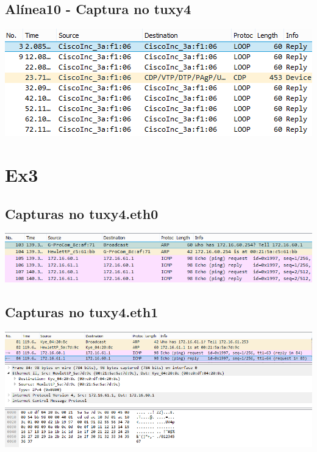 \documentclass[11pt,a4paper,reqno]{report}
\numberwithin{equation}{section}
\begin{document}
\begin{appendices}
\subsection{Alínea10 - Captura no tuxy4}
\includegraphics[width=18cm]{ex2_a10_tux4.png}

\section{Ex3}%

\subsection{Capturas no tuxy4.eth0}
\label{ex3_eth0}
\includegraphics[width=18cm]{ex3_tux4eth0_ARP.png}

\subsection{Capturas no tuxy4.eth1}
\label{ex3_eth1}
\includegraphics[width=18cm]{ex3_tux4eth1_pingdetailed.png}



\end{appendices}
\end{document}
